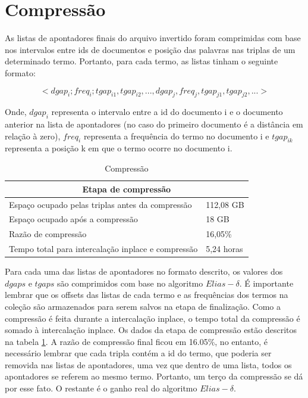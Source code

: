 \documentclass{report}
\begin{document}
\section{Compressão}

As listas de apontadores finais do arquivo invertido foram comprimidas com base nos intervalos entre ids de documentos e posição
das palavras nas triplas de um determinado termo. Portanto, para cada termo, as listas tinham o seguinte formato:

\[ < dgap_i; freq_i; tgap_{i1}, tgap_{i2}, ..., dgap_j, freq_j, tgap_{j1}, tgap_{j2}, ... >\]

Onde, $ dgap_i $ representa o intervalo entre a id do documento i e o documento anterior na lista de apontadores (no caso do primeiro documento
é a distância em relação à zero), $ freq_i $ representa a frequência do termo no documento i e $ tgap_{ik} $ representa a posição k em que o termo 
ocorre no documento i.

\begin{table}
\centering
\begin{tabular}{ |l|l| }
  \hline
  \multicolumn{2}{|c|}{Etapa de compressão} \\
  \hline
  Espaço ocupado pelas triplas antes da compressão & 112,08 GB \\
  Espaço ocupado após a compressão & 18 GB \\
  Razão de compressão & 16,05\% \\
  Tempo total para intercalação inplace e compressão & 5,24 horas \\
  \hline
\end{tabular}
\caption{Compressão}
\label{tab:compression}
\end{table}

Para cada uma das listas de apontadores no formato descrito, os valores dos $ dgaps $ e $ tgaps $ são comprimidos com base no algoritmo $ Elias-\delta $.
É importante lembrar que os offsets das listas de cada termo e as frequências dos termos na coleção são armazenados para serem salvos na etapa de finalização.
Como a compressão é feita durante a intercalação inplace, o tempo total da compressão é somado à intercalação inplace. Os dados da etapa de compressão
estão descritos na tabela \ref{tab:compression}. A razão de compressão final ficou em 16.05\%, no entanto, é necessário lembrar que cada tripla contém 
a id do termo, que poderia ser removida nas listas de apontadores, uma vez que dentro de uma lista, todos os apontadores se referem ao mesmo termo. Portanto, 
um terço da compressão se dá por esse fato. O restante é o ganho real do algoritmo $ Elias-\delta $.
\end{document}
